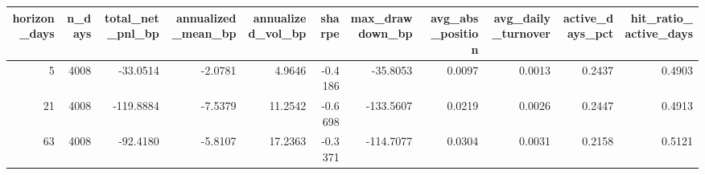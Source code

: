 \begin{tabular}{rrrrrrrrrrr}
\toprule
horizon_days & n_days & total_net_pnl_bp & annualized_mean_bp & annualized_vol_bp & sharpe & max_drawdown_bp & avg_abs_position & avg_daily_turnover & active_days_pct & hit_ratio_active_days \\
\midrule
5 & 4008 & -33.0514 & -2.0781 & 4.9646 & -0.4186 & -35.8053 & 0.0097 & 0.0013 & 0.2437 & 0.4903 \\
21 & 4008 & -119.8884 & -7.5379 & 11.2542 & -0.6698 & -133.5607 & 0.0219 & 0.0026 & 0.2447 & 0.4913 \\
63 & 4008 & -92.4180 & -5.8107 & 17.2363 & -0.3371 & -114.7077 & 0.0304 & 0.0031 & 0.2158 & 0.5121 \\
\bottomrule
\end{tabular}
